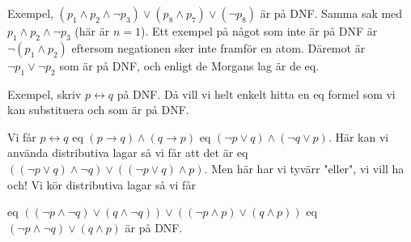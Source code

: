 \noindent Exempel, $(p_1\wedge p_2\wedge\neg p_3)\vee(p_8\wedge p_7)\vee(\neg p_8)$ är på DNF. Samma sak med $p_1\wedge p_2\wedge\neg p_3$ (här är $n=1$). Ett exempel på något som inte är på DNF är $\neg(p_1\wedge p_2)$ eftersom negationen sker inte framför en atom. Däremot är $\neg p_1\vee\neg p_2$ som är på DNF, och enligt de Morgans lag är de eq.
\par\bigskip
\noindent Exempel, skriv $p\leftrightarrow q$ på DNF. Då vill vi helt enkelt hitta en eq formel som vi kan substituera och som är på DNF.\par\noindent Vi får $p\leftrightarrow q$ eq $(p\rightarrow q)\wedge(q\rightarrow p)$ eq $(\neg p\vee q)\wedge(\neg q\vee p)$. Här kan vi använda distributiva lagar så vi får att det är eq $((\neg p\vee q)\wedge\neg q)\vee((\neg p\vee q)\wedge p)$. Men här har vi tyvärr "eller", vi vill ha och! Vi kör distributiva lagar så vi får\par\noindent eq $((\neg p\wedge\neg q)\vee(q\wedge\neg q))\vee((\neg p \wedge p)\vee(q\wedge p))$ eq $(\neg p \wedge\neg q)\vee(q\wedge p)$ är på DNF.
\par\bigskip

